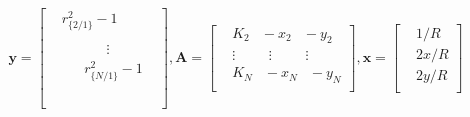 \documentclass[journal]{IEEEtran}
\begin{document}
\begin{equation}\label{eq:2.511}
\mathbf{y}\!=\!\left[ \begin{aligned}
  & \!r_{\{2/1\}}^{2}\!-\!1\! \\
 & \begin{matrix}
   \begin{aligned}
  & \begin{matrix}
   {}  \\
\end{matrix}\begin{matrix}
   {}  \\
\end{matrix}\vdots  \\
 & \!r_{\{N/1\}}^{2}\!-\!1\! \\
\end{aligned}  \\
\end{matrix} \\
\end{aligned} \right],\mathbf{A}=\left[ \begin{aligned}
  & {{K}_{2}}\begin{matrix}
   {}  \\
\end{matrix}\!-\!{{x}_{2}}\begin{matrix}
   {}  \\
\end{matrix}\!-\!{{y}_{2}} \\
 & \vdots \begin{matrix}
   {} & {}  \\
\end{matrix}\begin{matrix}
   {}  \\
\end{matrix}\vdots \begin{matrix}
   {} & {}  \\
\end{matrix}\begin{matrix}
   {}  \\
\end{matrix}\vdots  \\
 & {{K}_{N}}\begin{matrix}
   {}  \\
\end{matrix}\!-\!{{x}_{N}}\begin{matrix}
   {}  \\
\end{matrix}\!-\!{{y}_{N}} \\
\end{aligned} \right],\mathbf{x}\!=\!\left[ \begin{aligned}
  & 1\!/\!R \\
 & 2x\!/\!R \\
 & 2y\!/\!R \\
\end{aligned} \right]
\end{equation}
\end{document}
